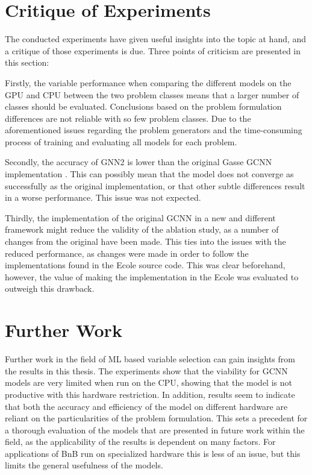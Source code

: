 \section{Critique of Experiments}

The conducted experiments have given useful insights into the topic at hand, and a critique of those experiments is due. Three points of criticism are presented in this section:


Firstly, the variable performance when comparing the different models on the \gls{GPU} and \gls{CPU} between the two problem classes means that a larger number of classes should be evaluated. Conclusions based on the problem formulation differences are not reliable with so few problem classes. Due to the aforementioned issues regarding the problem generators and the time-consuming process of training and evaluating all models for each problem. 

Secondly, the accuracy of GNN2 is lower than the original Gasse \gls{GCNN} implementation \cite{gasse2019exact}. This can possibly mean that the model does not converge as successfully as the original implementation, or that other subtle differences result in a worse performance. This issue was not expected. 

Thirdly, the implementation of the original \gls{GCNN} in a new and different framework might reduce the validity of the ablation study, as a number of changes from the original have been made.
 This ties into the issues with the reduced performance, as changes were made in order to follow the implementations found in the \gls{Ecole} source code. This was clear beforehand, however, the value of making the implementation in the \gls{Ecole} was evaluated to outweigh this drawback.



\section{Further Work}\label{sec:disc_furtherwork}

Further work in the field of \gls{ML} based variable selection can gain insights from the results in this thesis.
The experiments show that the viability for \gls{GCNN} models are very limited when run on the \gls{CPU}, showing that the model is not productive with this hardware restriction. In addition, results seem to indicate that both the accuracy and efficiency of the model on different hardware are reliant on the particularities of the problem formulation. This sets a precedent for a thorough evaluation of the models that are presented in future work within the field, as the applicability of the results is dependent on many factors. For applications of \gls{BnB} run on specialized hardware this is less of an issue, but this limits the general usefulness of the models. 

